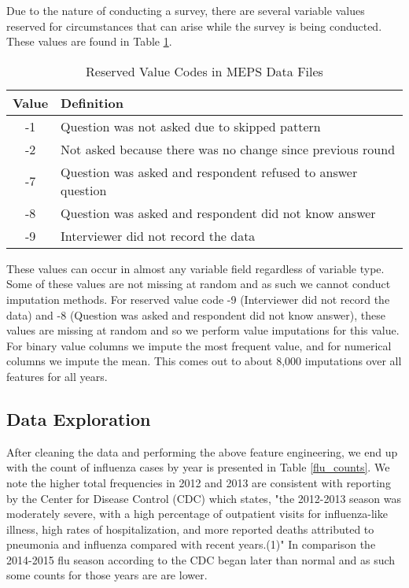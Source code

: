 \documentclass[twoside,11pt]{article}
\begin{document}
Due to the nature of conducting a survey, there are several variable values reserved for circumstances that can arise while the survey is being conducted.  These values are found in Table \ref{reserved_vals}.

\begin{table}[h]
\centering
\caption{Reserved Value Codes in MEPS Data Files}
\label{reserved_vals}
\begin{tabular}{cl}
\hline
Value & Definition\\ \hline
-1 & Question was not asked due to skipped pattern\\
-2 & Not asked because there was no change since previous round \\
-7 & Question was asked and respondent refused to answer question\\
-8 & Question was asked and respondent did not know answer\\
-9 & Interviewer did not record the data\\
\end{tabular}
\end{table}

These values can occur in almost any variable field regardless of variable type.  Some of these values are not missing at random and as such we cannot conduct imputation methods. For reserved value code -9 (Interviewer did not record the data) and -8 (Question was asked and respondent did not know answer), these values are missing at random and so we perform value imputations for this value.  For binary value columns we impute the most frequent value, and for numerical columns we impute the mean. This comes out to about 8,000 imputations over all features for all years.  

\subsection{Data Exploration}

After cleaning the data and performing the above feature engineering, we end up with the count of influenza cases by year is presented in Table \ref{flu_counts}.  We note the higher total frequencies in 2012 and 2013 are consistent with reporting by the Center for Disease Control (CDC) which states, "the 2012-2013 season was moderately severe, with a high percentage of outpatient visits for influenza-like illness, high rates of hospitalization, and more reported deaths attributed to pneumonia and influenza compared with recent years.(1)"  In comparison the 2014-2015 flu season according to the CDC began later than normal and as such some counts for those years are are lower.
\end{document}
